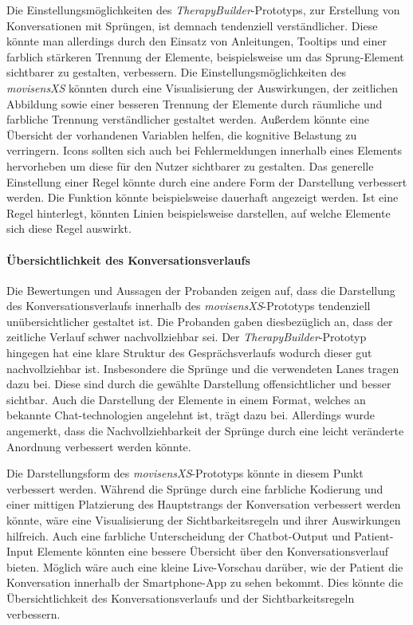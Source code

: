 Die Einstellungsmöglichkeiten des \emph{TherapyBuilder}-Prototyps, zur Erstellung von Konversationen mit Sprüngen, ist demnach tendenziell verständlicher. Diese könnte man allerdings durch den Einsatz von Anleitungen, Tooltips und einer farblich stärkeren Trennung der Elemente, beispielsweise um das Sprung-Element sichtbarer zu gestalten, verbessern. Die Einstellungsmöglichkeiten des \emph{movisensXS} könnten durch eine Visualisierung der Auswirkungen, der zeitlichen Abbildung sowie einer besseren Trennung der Elemente durch räumliche und farbliche Trennung verständlicher gestaltet werden. Außerdem könnte eine Übersicht der vorhandenen Variablen helfen, die kognitive Belastung zu verringern. Icons sollten sich auch bei Fehlermeldungen innerhalb eines Elements hervorheben um diese für den Nutzer sichtbarer zu gestalten. Das generelle Einstellung einer Regel könnte durch eine andere Form der Darstellung verbessert werden. Die Funktion könnte beispielsweise dauerhaft angezeigt werden. Ist eine Regel hinterlegt, könnten Linien beispielsweise darstellen, auf welche Elemente sich diese Regel auswirkt.


\paragraph{Übersichtlichkeit des Konversationsverlaufs}
Die Bewertungen und Aussagen der Probanden zeigen auf, dass die Darstellung des Konversationsverlaufs innerhalb des \emph{movisensXS}-Prototyps tendenziell unübersichtlicher gestaltet ist. Die Probanden gaben diesbezüglich an, dass der zeitliche Verlauf schwer nachvollziehbar sei. Der \emph{TherapyBuilder}-Prototyp hingegen hat eine klare Struktur des Gesprächsverlaufs wodurch dieser gut nachvollziehbar ist. Insbesondere die Sprünge und die verwendeten Lanes tragen dazu bei. Diese sind durch die gewählte Darstellung offensichtlicher und besser sichtbar. Auch die Darstellung der Elemente in einem Format, welches an bekannte Chat-technologien angelehnt ist, trägt dazu bei. Allerdings wurde angemerkt, dass die Nachvollziehbarkeit der Sprünge durch eine leicht veränderte Anordnung verbessert werden könnte.

Die Darstellungsform des \emph{movisensXS}-Prototyps könnte in diesem Punkt verbessert werden. Während die Sprünge durch eine farbliche Kodierung und einer mittigen Platzierung des Hauptstrangs der Konversation verbessert werden könnte, wäre eine Visualisierung der Sichtbarkeitsregeln und ihrer Auswirkungen hilfreich. Auch eine farbliche Unterscheidung der Chatbot-Output und Patient-Input Elemente könnten eine bessere Übersicht über den Konversationsverlauf bieten. Möglich wäre auch eine kleine Live-Vorschau darüber, wie der Patient die Konversation innerhalb der Smartphone-App zu sehen bekommt. Dies könnte die Übersichtlichkeit des Konversationsverlaufs und der Sichtbarkeitsregeln verbessern. 

